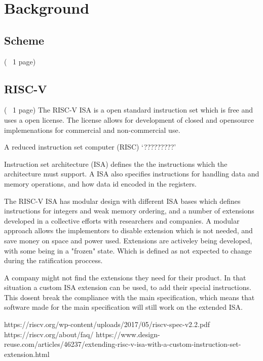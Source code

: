 \section{Background}


\subsection{Scheme}
(~ 1 page)


\subsection{RISC-V}
(~ 1 page)
The RISC-V ISA is a open standard instruction set which is free and uses a open license. The license allows for development of closed and opensource implemenations for commercial and non-commercial use.

A reduced instruction set computer (RISC) `?????????'


Instruction set architecture (ISA) defines the the instructions which the architecture must support. A ISA also specifies instructions for handling data and memory operations, and how data id encoded in the registers.

The RISC-V ISA has modular design with different ISA bases which defines instructions for integers and weak memory ordering, and a number of extensions developed in a collective efforts with researchers and companies.
A modular approach allows the implementors to disable extension which is not needed, and save money on space and power used. 
Extensions are activeley being developed, with some being in a "frozen" state. Which is defined as not expected to change during the ratification proccess.

A company might not find the extensions they need for their product. In that situation a custom ISA extension can be used, to add their special instructions. 
This dosent break the compliance with the main specification, which means that software made for the main specification will still work on the extended ISA.

https://riscv.org/wp-content/uploads/2017/05/riscv-spec-v2.2.pdf
https://riscv.org/about/faq/
https://www.design-reuse.com/articles/46237/extending-risc-v-isa-with-a-custom-instruction-set-extension.html
